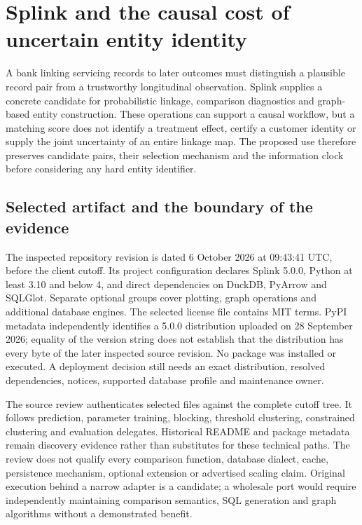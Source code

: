 \section{Splink and the causal cost of uncertain entity identity}
\label{sec:exec24-splink}
A bank linking servicing records to later outcomes must distinguish a plausible record pair from a trustworthy longitudinal observation. Splink supplies a concrete candidate for probabilistic linkage, comparison diagnostics and graph-based entity construction. These operations can support a causal workflow, but a matching score does not identify a treatment effect, certify a customer identity or supply the joint uncertainty of an entire linkage map. The proposed use therefore preserves candidate pairs, their selection mechanism and the information clock before considering any hard entity identifier.\citep{exec24_splink_sources,exec24_splink_contract}

\subsection{Selected artifact and the boundary of the evidence}
The inspected repository revision is dated 6 October 2026 at 09:43:41 UTC, before the client cutoff. Its project configuration declares Splink 5.0.0, Python at least 3.10 and below 4, and direct dependencies on DuckDB, PyArrow and SQLGlot. Separate optional groups cover plotting, graph operations and additional database engines. The selected license file contains MIT terms. PyPI metadata independently identifies a 5.0.0 distribution uploaded on 28 September 2026; equality of the version string does not establish that the distribution has every byte of the later inspected source revision. No package was installed or executed. A deployment decision still needs an exact distribution, resolved dependencies, notices, supported database profile and maintenance owner.\citep{exec24_splink_sources}

The source review authenticates selected files against the complete cutoff tree. It follows prediction, parameter training, blocking, threshold clustering, constrained clustering and evaluation delegates. Historical README and package metadata remain discovery evidence rather than substitutes for these technical paths. The review does not qualify every comparison function, database dialect, cache, persistence mechanism, optional extension or advertised scaling claim. Original execution behind a narrow adapter is a candidate; a wholesale port would require independently maintaining comparison semantics, SQL generation and graph algorithms without a demonstrated benefit.\citep{exec24_splink_sources,exec24_splink_contract}

